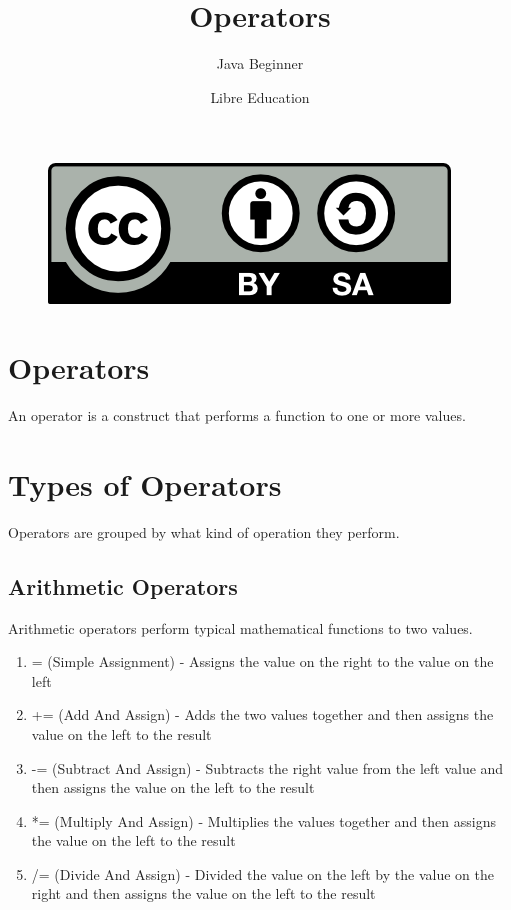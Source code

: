 \documentclass[a4paper]{article}
\title{Operators}
\subtitle{Java Beginner}
\date{}
\author{Libre Education}
\begin{document}
\maketitle


\begin{figure}[b]
\includegraphics{BY-SA}
\centering
\end{figure}

\newpage

\section*{Operators}

An operator is a construct that performs a function to one or more values.

\section*{Types of Operators}
Operators are grouped by what kind of operation they perform.

\subsection*{Arithmetic Operators}
Arithmetic operators perform typical mathematical functions to two values.
\begin{enumerate}

\item = (Simple Assignment) - Assigns the value on the right to the value on the left

\item += (Add And Assign) - Adds the two values together and then assigns the value on the left to the result

\item -= (Subtract And Assign) - Subtracts the right value from the left value and then assigns the value on the left to the result

\item *= (Multiply And Assign) - Multiplies the values together and then assigns the value on the left to the result

\item /= (Divide And Assign) - Divided the value on the left by the value on the right and then assigns the value on the left to the result

\end{enumerate}
\end{document}
